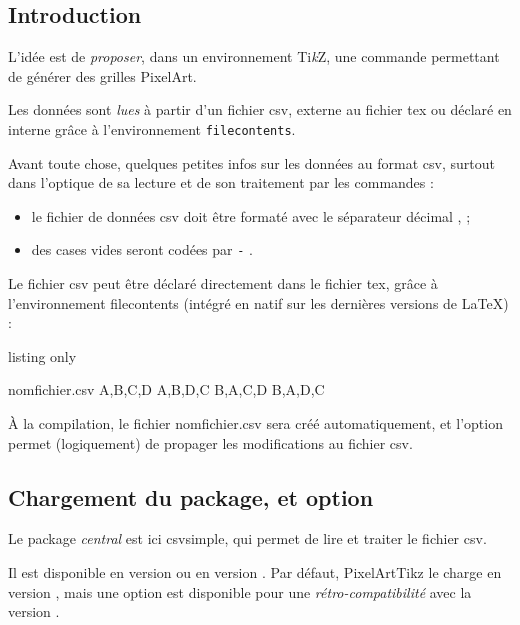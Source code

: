 \documentclass{article}
\newcommand\Cle[1]{{\bfseries\sffamily\textlangle #1\textrangle}}
\begin{document}
\subsection{Introduction}

L'idée est de \textit{proposer}, dans un environnement Ti\textit{k}Z, une commande permettant de générer des grilles PixelArt.

Les données sont \textit{lues} à partir d'un fichier \textsf{csv}, externe au fichier \textsf{tex} ou déclaré en interne grâce à l'environnement \texttt{filecontents}.

\medskip

Avant toute chose, quelques petites infos sur les données au format \textsf{csv}, surtout dans l'optique de sa lecture et de son traitement par les commandes :

\begin{itemize}
	\item le fichier de données \textsf{csv} doit être formaté avec le séparateur décimal \og , \fg ;
	\item des cases vides seront codées par \og \texttt{-} \fg.
\end{itemize}

Le fichier \textsf{csv} peut être déclaré directement dans le fichier \textsf{tex}, grâce à l'environnement \textsf{filecontents} (intégré en natif sur les dernières versions de \LaTeX) :

\begin{PresentationCode}{listing only}
\begin{filecontents*}{nomfichier.csv}
	A,B,C,D
	A,B,D,C
	B,A,C,D
	B,A,D,C
\end{filecontents*}
\end{PresentationCode}

À la compilation, le fichier \textsf{nomfichier.csv} sera créé automatiquement, et l'option \Cle{[overwrite]} permet (logiquement) de propager les modifications au fichier \textsf{csv}.

\subsection{Chargement du package, et option}

Le package \textit{central} est ici \textsf{csvsimple}, qui permet de lire et traiter le fichier \textsf{csv}.

Il est \og disponible \fg{} en version  ou en version . Par défaut, \textsf{PixelArtTikz} le charge en version , mais une \textsf{option} est disponible pour une \textit{rétro-compatibilité} avec la version .
\end{document}

